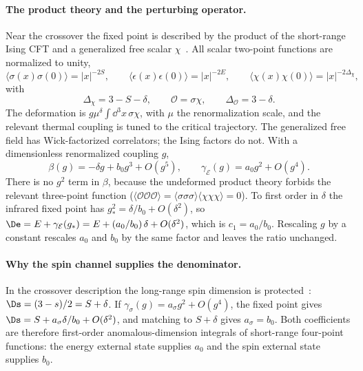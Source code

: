 \paragraph{The product theory and the perturbing operator.} Near the crossover the fixed point is described by the
product of the short-range Ising CFT and a generalized free scalar $\chi$~\cite{sri:Behan:2017dwr,sri:Behan:2017emf}. All
scalar two-point functions are normalized to unity,
\begin{equation}
 \langle\sigma(x)\sigma(0)\rangle=|x|^{-2S},\qquad
 \langle\epsilon(x)\epsilon(0)\rangle=|x|^{-2E},\qquad
 \langle\chi(x)\chi(0)\rangle=|x|^{-2\Delta_\chi},
\end{equation}
with
\begin{equation}
 \Delta_\chi=3-S-\delta,\qquad \mathcal O=\sigma\chi,\qquad \Delta_{\mathcal O}=3-\delta .
\end{equation}
The deformation is $g\mu^\delta\int\dd^3x\,\sigma\chi$, with $\mu$ the renormalization scale, and the relevant
thermal coupling is tuned to the critical trajectory. The generalized free field has Wick-factorized correlators; the
Ising factors do not. With a dimensionless renormalized coupling $g$,
\begin{equation}
 \beta(g)=-\delta g+b_0g^3+O(g^5),\qquad \gamma_{\mathcal E}(g)=a_0g^2+O(g^4).
\end{equation}
There is no $g^2$ term in $\beta$, because the undeformed product theory forbids the relevant three-point function
($\langle\mathcal O\mathcal O\mathcal O\rangle=\langle\sigma\sigma\sigma\rangle\langle\chi\chi\chi\rangle=0$). To
first order in $\delta$ the infrared fixed point has $g_*^2=\delta/b_0+O(\delta^2)$, so
$\De=E+\gamma_{\mathcal E}(g_*)=E+(a_0/b_0)\,\delta+O(\delta^2)$, which is $c_1=a_0/b_0$. Rescaling $g$ by a constant
rescales $a_0$ and $b_0$ by the same factor and leaves the ratio unchanged.

\paragraph{Why the spin channel supplies the denominator.} In the crossover description the long-range spin dimension
is protected~\cite{sri:Behan:2017emf}: $\Ds=(3-s)/2=S+\delta$. If $\gamma_\sigma(g)=a_\sigma g^2+O(g^4)$, the fixed point
gives $\Ds=S+a_\sigma\delta/b_0+O(\delta^2)$, and matching to $S+\delta$ gives $a_\sigma=b_0$. Both coefficients are
therefore first-order anomalous-dimension integrals of short-range four-point functions: the energy external state
supplies $a_0$ and the spin external state supplies $b_0$.

